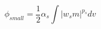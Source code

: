 \vspace{-0.1cm}

\begin{equation}
    \phi_{small}=\frac{1}{2}{\alpha_s}\int 
    |w_s m|^{p_s} dv
\end{equation}

